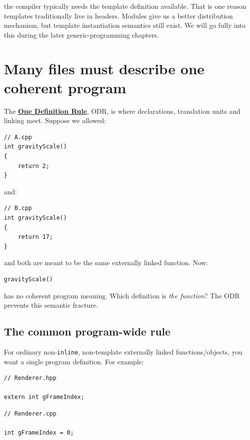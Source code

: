 the compiler typically needs the template definition available. That is one reason templates traditionally live in headers. Modules give us a better distribution mechanism, but template instantiation semantics still exist. We will go fully into this during the later generic-programming chapters.

\section{Many files must describe one coherent program}\label{05-engine-i-ch002-many-files-must-describe-one-coherent-program}

The \textbf{\hyperref[appendix-49d27bc9d9a5]{One Definition Rule}}, ODR, is where declarations, translation units and linking meet. Suppose we allowed:

\begin{verbatim}
// A.cpp
int gravityScale()
{
    return 2;
}
\end{verbatim}

and:

\begin{verbatim}
// B.cpp
int gravityScale()
{
    return 17;
}
\end{verbatim}

and both are meant to be the same externally linked function. Now:

\begin{verbatim}
gravityScale()
\end{verbatim}

has no coherent program meaning. Which definition is \emph{the function}? The ODR prevents this semantic fracture.

\subsection{The common program-wide rule}\label{05-engine-i-ch002-the-common-program-wide-rule}

For ordinary non-\texttt{inline}, non-template externally linked functions/objects, you want a single program definition. For example:

\begin{verbatim}
// Renderer.hpp

extern int gFrameIndex;
\end{verbatim}

\begin{verbatim}
// Renderer.cpp

int gFrameIndex = 0;
\end{verbatim}

